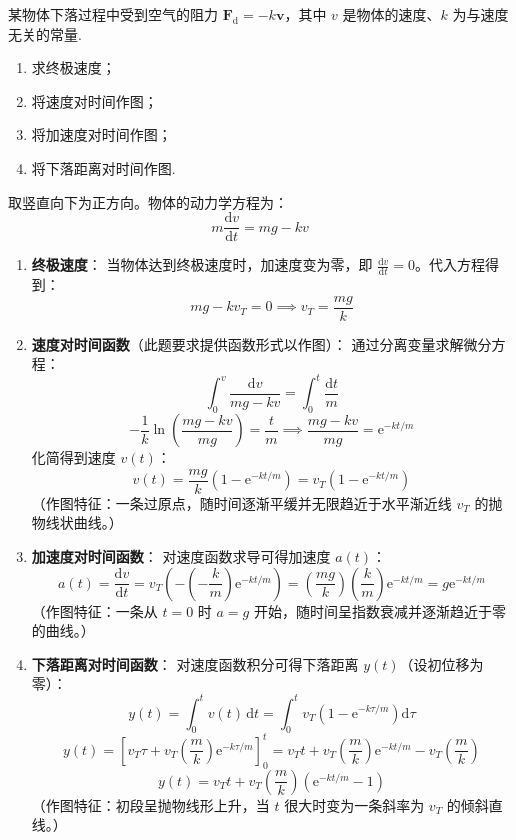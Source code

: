 \begin{exercise}\label{ex:3.5}
某物体下落过程中受到空气的阻力 $\boldsymbol{F}_{\mathrm{d}} = -k\boldsymbol{v}$，其中 $v$ 是物体的速度、$k$ 为与速度无关的常量.
\begin{enumerate}
  \item[(a)] 求终极速度；
  \item[(b)] 将速度对时间作图；
  \item[(c)] 将加速度对时间作图；
  \item[(d)] 将下落距离对时间作图.
\end{enumerate}
\end{exercise}
\begin{solution}
取竖直向下为正方向。物体的动力学方程为：
$$ m \frac{\mathrm{d}v}{\mathrm{d}t} = mg - kv $$

\begin{enumerate}
    \item[(a)] \textbf{终极速度}：
    当物体达到终极速度时，加速度变为零，即 $\frac{\mathrm{d}v}{\mathrm{d}t} = 0$。代入方程得到：
    $$ mg - kv_T = 0 \implies v_T = \frac{mg}{k} $$

    \item[(b)] \textbf{速度对时间函数}（此题要求提供函数形式以作图）：
    通过分离变量求解微分方程：
    $$ \int_0^v \frac{\mathrm{d}v}{mg - kv} = \int_0^t \frac{\mathrm{d}t}{m} $$
    $$ -\frac{1}{k} \ln\left( \frac{mg - kv}{mg} \right) = \frac{t}{m} \implies \frac{mg - kv}{mg} = \mathrm{e}^{-kt/m} $$
    化简得到速度 $v(t)$：
    $$ v(t) = \frac{mg}{k} \left( 1 - \mathrm{e}^{-kt/m} \right) = v_T \left( 1 - \mathrm{e}^{-kt/m} \right) $$
    （作图特征：一条过原点，随时间逐渐平缓并无限趋近于水平渐近线 $v_T$ 的抛物线状曲线。）

    \item[(c)] \textbf{加速度对时间函数}：
    对速度函数求导可得加速度 $a(t)$：
    $$ a(t) = \frac{\mathrm{d}v}{\mathrm{d}t} = v_T \left( - \left( -\frac{k}{m} \right) \mathrm{e}^{-kt/m} \right) = \left( \frac{mg}{k} \right) \left( \frac{k}{m} \right) \mathrm{e}^{-kt/m} = g \mathrm{e}^{-kt/m} $$
    （作图特征：一条从 $t=0$ 时 $a=g$ 开始，随时间呈指数衰减并逐渐趋近于零的曲线。）

    \item[(d)] \textbf{下落距离对时间函数}：
    对速度函数积分可得下落距离 $y(t)$（设初位移为零）：
    $$ y(t) = \int_0^t v(t) \, \mathrm{d}t = \int_0^t v_T \left( 1 - \mathrm{e}^{-k\tau/m} \right) \mathrm{d}\tau $$
    $$ y(t) = \left[ v_T \tau + v_T \left( \frac{m}{k} \right) \mathrm{e}^{-k\tau/m} \right]_0^t = v_T t + v_T \left( \frac{m}{k} \right) \mathrm{e}^{-kt/m} - v_T \left( \frac{m}{k} \right) $$
    $$ y(t) = v_T t + v_T \left( \frac{m}{k} \right) \left( \mathrm{e}^{-kt/m} - 1 \right) $$
    （作图特征：初段呈抛物线形上升，当 $t$ 很大时变为一条斜率为 $v_T$ 的倾斜直线。）
\end{enumerate}
\end{solution}

